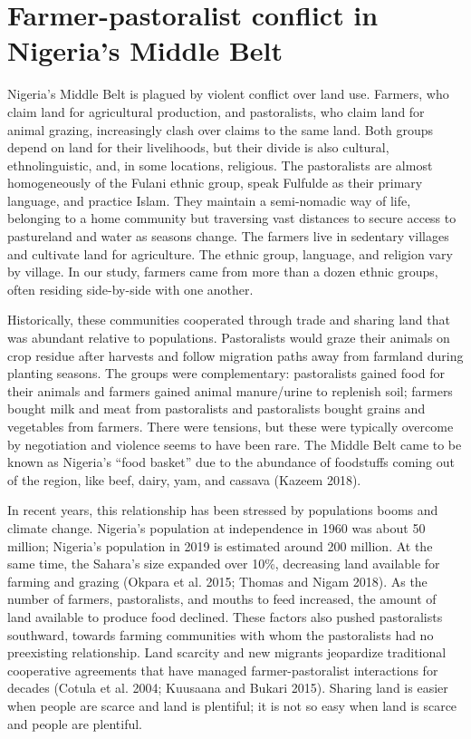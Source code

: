 \documentclass[11pt]{article}
\begin{document}
\hypertarget{farmer-pastoralist-conflict-in-nigerias-middle-belt}{%
\section{Farmer-pastoralist conflict in Nigeria's Middle
Belt}\label{farmer-pastoralist-conflict-in-nigerias-middle-belt}}

Nigeria's Middle Belt is plagued by violent conflict over land use.
Farmers, who claim land for agricultural production, and pastoralists,
who claim land for animal grazing, increasingly clash over claims to the
same land. Both groups depend on land for their livelihoods, but their
divide is also cultural, ethnolinguistic, and, in some locations,
religious. The pastoralists are almost homogeneously of the Fulani
ethnic group, speak Fulfulde as their primary language, and practice
Islam. They maintain a semi-nomadic way of life, belonging to a home
community but traversing vast distances to secure access to pastureland
and water as seasons change. The farmers live in sedentary villages and
cultivate land for agriculture. The ethnic group, language, and religion
vary by village. In our study, farmers came from more than a dozen
ethnic groups, often residing side-by-side with one another.

Historically, these communities cooperated through trade and sharing
land that was abundant relative to populations. Pastoralists would graze
their animals on crop residue after harvests and follow migration paths
away from farmland during planting seasons. The groups were
complementary: pastoralists gained food for their animals and farmers
gained animal manure/urine to replenish soil; farmers bought milk and
meat from pastoralists and pastoralists bought grains and vegetables
from farmers. There were tensions, but these were typically overcome by
negotiation and violence seems to have been rare. The Middle Belt came
to be known as Nigeria's ``food basket'' due to the abundance of
foodstuffs coming out of the region, like beef, dairy, yam, and cassava
(Kazeem 2018).

In recent years, this relationship has been stressed by populations
booms and climate change. Nigeria's population at independence in 1960
was about 50 million; Nigeria's population in 2019 is estimated around
200 million. At the same time, the Sahara's size expanded over 10\%,
decreasing land available for farming and grazing (Okpara et al. 2015;
Thomas and Nigam 2018). As the number of farmers, pastoralists, and
mouths to feed increased, the amount of land available to produce food
declined. These factors also pushed pastoralists southward, towards
farming communities with whom the pastoralists had no preexisting
relationship. Land scarcity and new migrants jeopardize traditional
cooperative agreements that have managed farmer-pastoralist interactions
for decades (Cotula et al. 2004; Kuusaana and Bukari 2015). Sharing land
is easier when people are scarce and land is plentiful; it is not so
easy when land is scarce and people are plentiful.
\end{document}
